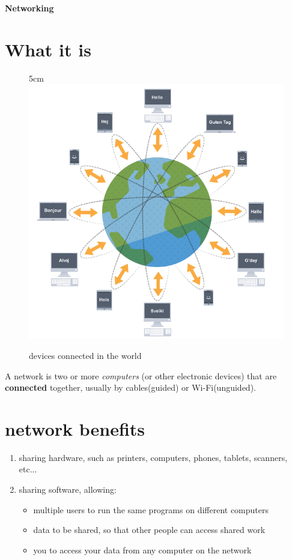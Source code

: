 \documentclass[a4paper,12pt]{article}
\begin{document}
\textbf{Networking}


\tableofcontents
\clearpage

\section{What it is}


\begin{figure}[21]{5cm}
\centering
\includegraphics[width=12cm]{./net.png}
\caption{devices connected in the world}\label{wrap-fig:5}
\end{figure}

A network is two or more \emph{computers} (or other electronic devices) that are \textbf{connected} together, usually by cables(guided) or Wi-Fi(unguided).



\section {network benefits}
\begin{enumerate}
\item {sharing hardware, such as printers, computers, phones, tablets, scanners, etc...}\footnotemark{}
\item {sharing software, allowing:}
    \begin{itemize}
    \item{multiple users to run the same programs on different computers}
    \item{data to be shared, so that other people can access shared work}
    \item{you to access your data from any computer on the network}
    \end{itemize}
\end{enumerate}
\end{document}
